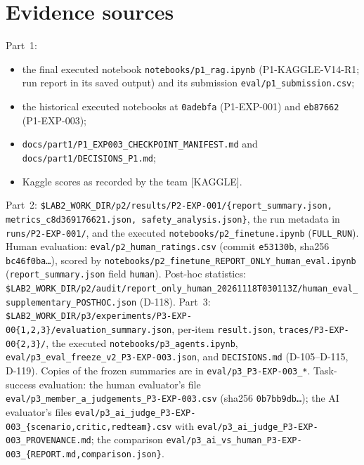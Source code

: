 \documentclass[conference]{IEEEtran}
\begin{document}
\section{Evidence sources}
Part~1:
\begin{itemize}
\item the final executed notebook \texttt{notebooks/p1\_rag.ipynb} (P1-KAGGLE-V14-R1; run report in its saved output) and its submission \texttt{eval/p1\_submission.csv};
\item the historical executed notebooks at \texttt{0adebfa} (P1-EXP-001) and \texttt{eb87662} (P1-EXP-003);
\item \texttt{docs/part1/P1\_EXP003\_CHECKPOINT\_MANIFEST.md} and \texttt{docs/part1/DECISIONS\_P1.md};
\item Kaggle scores as recorded by the team [KAGGLE].
\end{itemize}
Part~2: \texttt{\$LAB2\_WORK\_DIR/p2/results/P2-EXP-001/\{report\_summary.json, metrics\_c8d369176621.json, safety\_analysis.json\}}, the run metadata in \texttt{runs/P2-EXP-001/}, and the executed \texttt{notebooks/p2\_finetune.ipynb} (\texttt{FULL\_RUN}). Human evaluation: \texttt{eval/p2\_human\_ratings.csv} (commit \texttt{e53130b}, sha256 \texttt{bc46f0ba\ldots}), scored by \texttt{notebooks/p2\_finetune\_REPORT\_ONLY\_human\_eval.ipynb} (\texttt{report\_summary.json} field \texttt{human}). Post-hoc statistics: \texttt{\$LAB2\_WORK\_DIR/p2/audit/report\_only\_human\_20261118T030113Z/human\_eval\_supplementary\_POSTHOC.json} (D-118).
Part~3: \texttt{\$LAB2\_WORK\_DIR/p3/experiments/P3-EXP-00\{1,2,3\}/evaluation\_summary.json}, per-item \texttt{result.json}, \texttt{traces/P3-EXP-00\{2,3\}/}, the executed \texttt{notebooks/p3\_agents.ipynb}, \texttt{eval/p3\_eval\_freeze\_v2\_P3-EXP-003.json}, and \texttt{DECISIONS.md} (D-105--D-115, D-119). Copies of the frozen summaries are in \texttt{eval/p3\_P3-EXP-003\_*}. Task-success evaluation: the human evaluator's file \texttt{eval/p3\_member\_a\_judgements\_P3-EXP-003.csv} (sha256 \texttt{0b7bb9db\ldots}); the AI evaluator's files \texttt{eval/p3\_ai\_judge\_P3-EXP-003\_\{scenario,critic,redteam\}.csv} with \texttt{eval/p3\_ai\_judge\_P3-EXP-003\_PROVENANCE.md}; the comparison \texttt{eval/p3\_ai\_vs\_human\_P3-EXP-003\_\{REPORT.md,comparison.json\}}.
\end{document}
